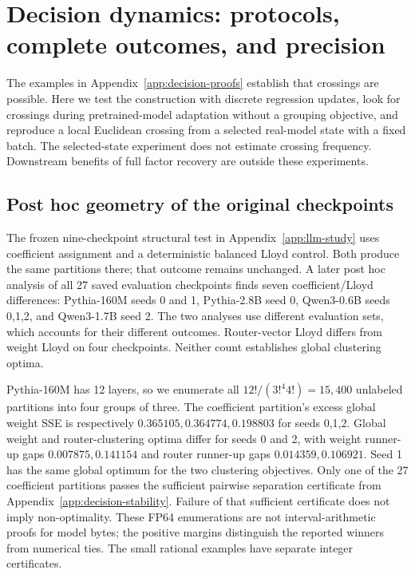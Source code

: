 \section{Decision dynamics: protocols, complete outcomes, and precision}
\label{app:dynamics-experiments}

The examples in Appendix~\ref{app:decision-proofs} establish that
crossings are possible. Here we test the construction with discrete
regression updates, look for crossings during pretrained-model adaptation
without a grouping objective, and reproduce a local Euclidean crossing
from a selected real-model state with a fixed batch. The selected-state
experiment does not estimate crossing frequency. Downstream benefits of
full factor recovery are outside these experiments.

\subsection{Post hoc geometry of the original checkpoints}

The frozen nine-checkpoint structural test in Appendix~\ref{app:llm-study}
uses coefficient assignment and a deterministic balanced Lloyd control.
Both produce the same partitions there; that outcome remains unchanged.
A later post hoc analysis of all 27 saved evaluation checkpoints finds seven
coefficient/Lloyd differences: Pythia-160M seeds 0 and 1, Pythia-2.8B seed 0,
Qwen3-0.6B seeds 0,1,2, and Qwen3-1.7B seed 2. The two analyses use different evaluation sets, which accounts for their
different outcomes. Router-vector Lloyd differs from
weight Lloyd on four checkpoints. Neither count establishes global
clustering optima.

Pythia-160M has 12 layers, so we enumerate all
$12!/(3!^4 4!)=15{,}400$ unlabeled partitions into four groups of three.
The coefficient partition's excess global weight SSE is respectively
$0.365105,0.364774,0.198803$ for seeds 0,1,2. Global weight and
router-clustering optima differ for seeds 0 and 2, with weight runner-up
gaps $0.007875,0.141154$ and router runner-up gaps $0.014359,0.106921$.
Seed 1 has the same global optimum for the two clustering objectives.
Only one of the 27 coefficient partitions passes the sufficient pairwise
separation certificate from Appendix~\ref{app:decision-stability}.
Failure of that sufficient certificate does not imply non-optimality.
These FP64 enumerations are not interval-arithmetic proofs for model bytes;
the positive margins distinguish the reported winners from numerical ties.
The small rational examples have separate integer certificates.

